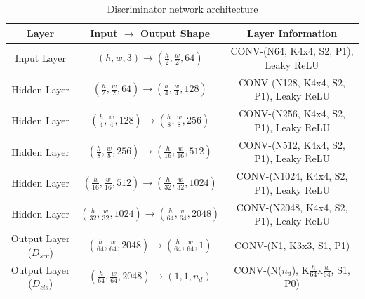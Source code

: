\documentclass[10pt,twocolumn,letterpaper]{article}
\begin{document}
\medskip

\begin{table}[h]
\setlength{\tabcolsep}{15pt}
\renewcommand{\arraystretch}{1.7}
\begin{center}
\begin{tabular}{c c c}
Layer & Input $\rightarrow$ Output Shape & Layer Information \\
\hline \hline
Input Layer & $(h, w, 3) \rightarrow (\frac{h}{2}, \frac{w}{2}, 64) $ & CONV-(N64, K4x4, S2, P1), Leaky ReLU \\
\Xhline{1.0pt}
Hidden Layer & $(\frac{h}{2}, \frac{w}{2}, 64) \rightarrow (\frac{h}{4}, \frac{w}{4}, 128) $ & CONV-(N128, K4x4, S2, P1), Leaky ReLU \\
Hidden Layer & $(\frac{h}{4}, \frac{w}{4}, 128) \rightarrow (\frac{h}{8}, \frac{w}{8}, 256) $ & CONV-(N256, K4x4, S2, P1), Leaky ReLU \\
Hidden Layer & $(\frac{h}{8}, \frac{w}{8}, 256) \rightarrow (\frac{h}{16}, \frac{w}{16}, 512) $ & CONV-(N512, K4x4, S2, P1), Leaky ReLU \\
Hidden Layer & $(\frac{h}{16}, \frac{w}{16}, 512) \rightarrow (\frac{h}{32}, \frac{w}{32}, 1024) $ & CONV-(N1024, K4x4, S2, P1), Leaky ReLU \\
Hidden Layer & $(\frac{h}{32}, \frac{w}{32}, 1024) \rightarrow (\frac{h}{64}, \frac{w}{64}, 2048) $ & CONV-(N2048, K4x4, S2, P1), Leaky ReLU \\
\Xhline{1.0pt}
Output Layer (${D}_{src}$) & $(\frac{h}{64}, \frac{w}{64}, 2048) \rightarrow (\frac{h}{64}, \frac{w}{64}, 1) $ & CONV-(N1, K3x3, S1, P1) \\
Output Layer (${D}_{cls}$) & $(\frac{h}{64}, \frac{w}{64}, 2048) \rightarrow (1, 1, {n}_{d}) $ & CONV-(N(${n}_{d}$), K$\frac{h}{64}$x$\frac{w}{64}$, S1, P0) \\
\hline \hline
\end{tabular}
\end{center}
\caption{Discriminator network architecture}
\label{table6}
\end{table}

\medskip
\end{document}
